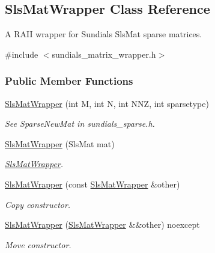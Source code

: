 \hypertarget{classamici_1_1_sls_mat_wrapper}{}\subsection{Sls\+Mat\+Wrapper Class Reference}
\label{classamici_1_1_sls_mat_wrapper}


A R\+A\+II wrapper for Sundials Sls\+Mat sparse matrices.  




{\ttfamily \#include $<$sundials\+\_\+matrix\+\_\+wrapper.\+h$>$}

\subsubsection*{Public Member Functions}
\begin{DoxyCompactItemize}
\item 
\mbox{\hyperlink{classamici_1_1_sls_mat_wrapper_adee74983e392e0c81240530278a3eddb}{Sls\+Mat\+Wrapper}} (int M, int N, int N\+NZ, int sparsetype)
\begin{DoxyCompactList}\small\item\em See Sparse\+New\+Mat in sundials\+\_\+sparse.\+h. \end{DoxyCompactList}\item 
\mbox{\hyperlink{classamici_1_1_sls_mat_wrapper_a576ba0e48c9ff113811b03f7b11a3a97}{Sls\+Mat\+Wrapper}} (Sls\+Mat mat)
\begin{DoxyCompactList}\small\item\em \mbox{\hyperlink{classamici_1_1_sls_mat_wrapper}{Sls\+Mat\+Wrapper}}. \end{DoxyCompactList}\item 
\mbox{\hyperlink{classamici_1_1_sls_mat_wrapper_a1a64ce4c1978dcf11d5649f810abd6af}{Sls\+Mat\+Wrapper}} (const \mbox{\hyperlink{classamici_1_1_sls_mat_wrapper}{Sls\+Mat\+Wrapper}} \&other)
\begin{DoxyCompactList}\small\item\em Copy constructor. \end{DoxyCompactList}\item 
\mbox{\hyperlink{classamici_1_1_sls_mat_wrapper_a724145bbf0b9e6aa66a81d8766874fcf}{Sls\+Mat\+Wrapper}} (\mbox{\hyperlink{classamici_1_1_sls_mat_wrapper}{Sls\+Mat\+Wrapper}} \&\&other) noexcept
\begin{DoxyCompactList}\small\item\em Move constructor. \end{DoxyCompactList}\item 

\end{DoxyCompactItemize}

